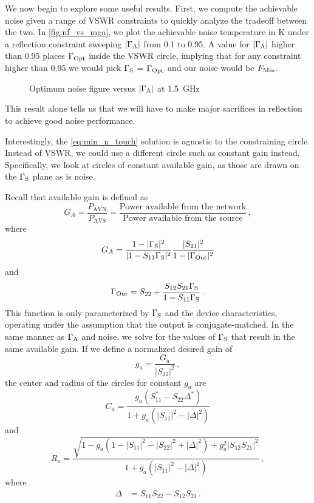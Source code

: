 We now begin to explore some useful results.
First, we compute the achievable noise given a range of VSWR constraints to quickly analyze the tradeoff between the two.
In \autoref{fig:nf_vs_mga}, we plot the achievable noise temperature in K under a reflection constraint sweeping $|\Gamma_{\text{A}}|$ from 0.1 to 0.95.
A value for $|\Gamma_{\text{A}}|$ higher than 0.95 places $\Gamma_{\text{Opt}}$ inside the VSWR circle, implying that for any constraint higher than 0.95 we would pick $\Gamma_{\text{S}}$ = $\Gamma_{\text{Opt}}$ and our noise would be $F_{\text{Min}}$.
%
\begin{figure}[ht!]
    \centering
    
    \caption{Optimum noise figure versus $|\Gamma_{\text{A}}|$ at \qty{1.5}{\GHz}}
    \label{fig:nf_vs_mga}
\end{figure}
%
This result alone tells us that we will have to make major sacrifices in reflection to achieve good noise performance.

Interestingly, the \autoref{eq:min_n_touch} solution is agnostic to the constraining circle.
Instead of VSWR, we could use a different circle such as constant gain instead.
Specifically, we look at circles of constant available gain, as those are drawn on the $\Gamma_{\text{S}}$ plane as is noise.

Recall that available gain is defined as
%
\begin{equation}
    G_A = \frac{P_\text{AVN}}{P_\text{AVS}} = \frac{\text{Power available from the network}}{\text{Power available from the source}}\,,
\end{equation}
%
where
%
\begin{equation}
    G_A = \frac{1-|\Gamma_{\text{S}}|^2}{|1-S_{11}\Gamma_{\text{S}}|^2}\frac{|S_{21}|^2}{1-|\Gamma_{\text{Out}}|^2}
    \label{eq:available_gain}
\end{equation}
%
and
%
\begin{equation}
    \Gamma_{\text{Out}} = S_{22} + \frac{S_{12}S_{21}\Gamma_{\text{S}}}{1-S_{11}\Gamma_{\text{S}}}\,.
    \label{eq:gamma_out}
\end{equation}
%
This function is only parameterized by $\Gamma_{\text{S}}$ and the device characteristics, operating under the assumption that the output is conjugate-matched.
In the same manner as $\Gamma_{\text{A}}$ and noise, we solve for the values of $\Gamma_{\text{S}}$ that result in the same available gain.
If we define a normalized desired gain of
%
\begin{equation}
    g_a = \frac{G_a}{|S_{21}|^2}\,,
\end{equation}
%
the center and radius of the circles for constant $g_a$ are
%
\begin{equation}
    C_a = \frac{g_a\left(S_{11}^*-S_{22}\Delta^*\right)}{1 + g_a\left(\left| S_{11}\right|^2 - |\Delta|^2\right)}
\end{equation}
%
and
%
\begin{equation}
    R_a = \frac{\sqrt{
    1-g_a\left(1-|S_{11}|^2-|S_{22}|^2 + |\Delta|^2\right) + g_a^2|S_{12}S_{21}|^2
    }}
    {1 + g_a\left(\left| S_{11}\right|^2 - |\Delta|^2\right)}\,,
\end{equation}
%
where
%
\begin{align*}
    \Delta &=S_{11}S_{22} - S_{12}S_{21}\,.
\end{align*}

